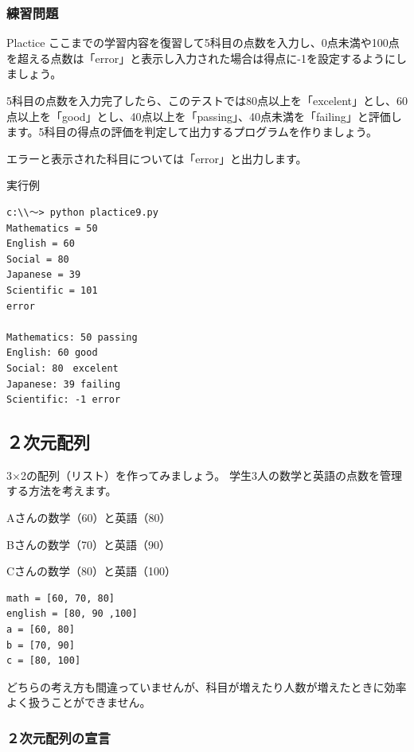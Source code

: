 \documentclass[11pt,a4paper,dvipdfmx,titlepage]{jsreport}
\begin{document}
\subsubsection{練習問題}
\begin{plabox}{Plactice}
ここまでの学習内容を復習して5科目の点数を入力し、0点未満や100点を超える点数は「error」と表示し入力された場合は得点に-1を設定するようにしましょう。

5科目の点数を入力完了したら、このテストでは80点以上を「excelent」とし、60点以上を「good」とし、40点以上を「passing」、40点未満を「failing」と評価します。5科目の得点の評価を判定して出力するプログラムを作りましょう。

エラーと表示された科目については「error」と出力します。


\begin{codebox}{実行例}
\begin{verbatim}
c:\\～> python plactice9.py
Mathematics = 50
English = 60
Social = 80
Japanese = 39
Scientific = 101
error

Mathematics: 50 passing
English: 60 good
Social: 80　excelent
Japanese: 39 failing
Scientific: -1 error
\end{verbatim}
\end{codebox}
\end{plabox}
\newpage
\subsection{２次元配列}


3×2の配列（リスト）を作ってみましょう。
学生3人の数学と英語の点数を管理する方法を考えます。
\begin{description}
\item Aさんの数学（60）と英語（80）
\item Bさんの数学（70）と英語（90）
\item Cさんの数学（80）と英語（100）
\end{description}

\begin{verbatim}
math = [60, 70, 80]
english = [80, 90 ,100]
a = [60, 80]
b = [70, 90]
c = [80, 100]
\end{verbatim}

どちらの考え方も間違っていませんが、科目が増えたり人数が増えたときに効率よく扱うことができません。

\subsubsection{２次元配列の宣言}
\end{document}
